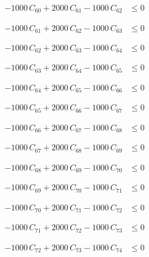 \documentclass[a4paper,11pt]{article}
\begin{document}
\begin{align}
-1000\,C_{60} + 2000\,C_{61} - 1000\,C_{62} &\leq 0 \nonumber
\end{align}

\begin{align}
-1000\,C_{61} + 2000\,C_{62} - 1000\,C_{63} &\leq 0 \nonumber
\end{align}

\begin{align}
-1000\,C_{62} + 2000\,C_{63} - 1000\,C_{64} &\leq 0 \nonumber
\end{align}

\begin{align}
-1000\,C_{63} + 2000\,C_{64} - 1000\,C_{65} &\leq 0 \nonumber
\end{align}

\begin{align}
-1000\,C_{64} + 2000\,C_{65} - 1000\,C_{66} &\leq 0 \nonumber
\end{align}

\begin{align}
-1000\,C_{65} + 2000\,C_{66} - 1000\,C_{67} &\leq 0 \nonumber
\end{align}

\begin{align}
-1000\,C_{66} + 2000\,C_{67} - 1000\,C_{68} &\leq 0 \nonumber
\end{align}

\begin{align}
-1000\,C_{67} + 2000\,C_{68} - 1000\,C_{69} &\leq 0 \nonumber
\end{align}

\begin{align}
-1000\,C_{68} + 2000\,C_{69} - 1000\,C_{70} &\leq 0 \nonumber
\end{align}

\begin{align}
-1000\,C_{69} + 2000\,C_{70} - 1000\,C_{71} &\leq 0 \nonumber
\end{align}

\begin{align}
-1000\,C_{70} + 2000\,C_{71} - 1000\,C_{72} &\leq 0 \nonumber
\end{align}

\begin{align}
-1000\,C_{71} + 2000\,C_{72} - 1000\,C_{73} &\leq 0 \nonumber
\end{align}

\begin{align}
-1000\,C_{72} + 2000\,C_{73} - 1000\,C_{74} &\leq 0 \nonumber
\end{align}
\end{document}
